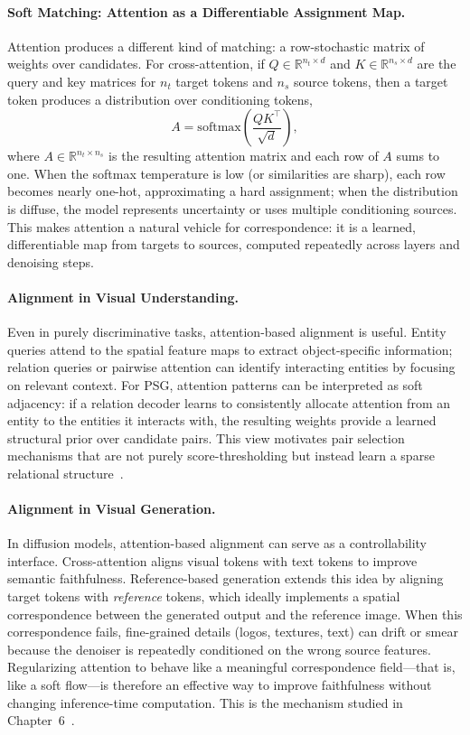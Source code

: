 \paragraph{Soft Matching: Attention as a Differentiable Assignment Map.}
Attention produces a different kind of matching: a row-stochastic matrix of weights over candidates. For cross-attention, if $Q\in\mathbb{R}^{n_t\times d}$ and $K\in\mathbb{R}^{n_s\times d}$ are the query and key matrices for $n_t$ target tokens and $n_s$ source tokens, then a target token produces a distribution over conditioning tokens,
\begin{equation}
A=\mathrm{softmax}\!\left(\frac{QK^\top}{\sqrt{d}}\right),
\end{equation}
where $A\in\mathbb{R}^{n_t\times n_s}$ is the resulting attention matrix and each row of $A$ sums to one. When the softmax temperature is low (or similarities are sharp), each row becomes nearly one-hot, approximating a hard assignment; when the distribution is diffuse, the model represents uncertainty or uses multiple conditioning sources. This makes attention a natural vehicle for correspondence: it is a learned, differentiable map from targets to sources, computed repeatedly across layers and denoising steps.

\paragraph{Alignment in Visual Understanding.}
Even in purely discriminative tasks, attention-based alignment is useful. Entity queries attend to the spatial feature maps to extract object-specific information; relation queries or pairwise attention can identify interacting entities by focusing on relevant context. For PSG, attention patterns can be interpreted as soft adjacency: if a relation decoder learns to consistently allocate attention from an entity to the entities it interacts with, the resulting weights provide a learned structural prior over candidate pairs. This view motivates pair selection mechanisms that are not purely score-thresholding but instead learn a sparse relational structure~\citep{wang2023pair}.

\paragraph{Alignment in Visual Generation.}
In diffusion models, attention-based alignment can serve as a controllability interface. Cross-attention aligns visual tokens with text tokens to improve semantic faithfulness. Reference-based generation extends this idea by aligning target tokens with \emph{reference} tokens, which ideally implements a spatial correspondence between the generated output and the reference image. When this correspondence fails, fine-grained details (logos, textures, text) can drift or smear because the denoiser is repeatedly conditioned on the wrong source features. Regularizing attention to behave like a meaningful correspondence field---that is, like a soft flow---is therefore an effective way to improve faithfulness without changing inference-time computation. This is the mechanism studied in Chapter~6~\citep{zhou2025learning}.


